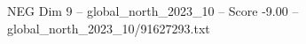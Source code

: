 \begin{textsample}{NEG Dim 9 – global\_north\_2023\_10 – Score -9.00 – global\_north\_2023\_10/91627293.txt}
\end{textsample}
